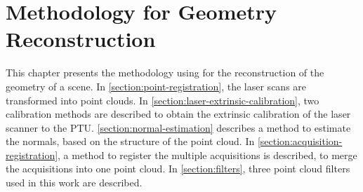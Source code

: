 \chapter{Methodology for Geometry Reconstruction}

This chapter presents the methodology using for the reconstruction of the geometry of a scene. In \cref{section:point-registration}, the laser scans are transformed into point clouds. In \cref{section:laser-extrinsic-calibration}, two calibration methods are described to obtain the extrinsic calibration of the laser scanner to the PTU. \cref{section:normal-estimation} describes a method to estimate the normals, based on the structure of the point cloud. In \cref{section:acquisition-registration}, a method to register the multiple acquisitions is described, to merge the acquisitions into one point cloud. In \cref{section:filters}, three point cloud filters used in this work are described.






